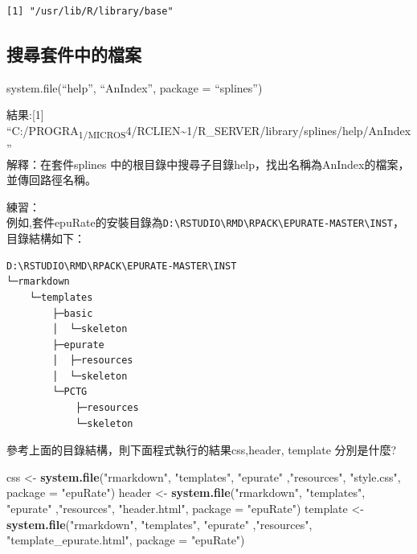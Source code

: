 \documentclass[]{book}
\newenvironment{Shaded}{\begin{snugshade}}{\end{snugshade}}
\newcommand{\DataTypeTok}[1]{\textcolor[rgb]{0.13,0.29,0.53}{#1}}
\newcommand{\KeywordTok}[1]{\textcolor[rgb]{0.13,0.29,0.53}{\textbf{#1}}}
\newcommand{\NormalTok}[1]{#1}
\newcommand{\StringTok}[1]{\textcolor[rgb]{0.31,0.60,0.02}{#1}}
\theoremstyle{definition}
\theoremstyle{definition}
\theoremstyle{definition}
\theoremstyle{remark}
\begin{document}
\begin{verbatim}
[1] "/usr/lib/R/library/base"
\end{verbatim}

\subsection{搜尋套件中的檔案}

system.file(``help'', ``AnIndex'', package = ``splines'')

結果:{[}1{]}
``C:/PROGRA\textsubscript{1/MICROS}4/RCLIEN\textasciitilde{}1/R\_SERVER/library/splines/help/AnIndex''\\
解釋：在套件splines
中的根目錄中搜尋子目錄help，找出名稱為AnIndex的檔案，並傳回路徑名稱。

練習：\\
例如,套件epuRate的安裝目錄為\texttt{D:\textbackslash{}RSTUDIO\textbackslash{}RMD\textbackslash{}RPACK\textbackslash{}EPURATE-MASTER\textbackslash{}INST}，目錄結構如下：

\begin{verbatim}
D:\RSTUDIO\RMD\RPACK\EPURATE-MASTER\INST
└─rmarkdown
    └─templates
        ├─basic
        │  └─skeleton
        ├─epurate
        │  ├─resources
        │  └─skeleton
        └─PCTG
            ├─resources
            └─skeleton
\end{verbatim}

參考上面的目錄結構，則下面程式執行的結果css,header, template 分別是什麼?

\begin{Shaded}
\begin{Highlighting}[]
\NormalTok{  css <-}\StringTok{ }\KeywordTok{system.file}\NormalTok{(}\StringTok{"rmarkdown"}\NormalTok{, }\StringTok{"templates"}\NormalTok{, }\StringTok{"epurate"}\NormalTok{ ,}\StringTok{"resources"}\NormalTok{, }\StringTok{"style.css"}\NormalTok{, }\DataTypeTok{package =} \StringTok{"epuRate"}\NormalTok{)}
\NormalTok{  header <-}\StringTok{ }\KeywordTok{system.file}\NormalTok{(}\StringTok{"rmarkdown"}\NormalTok{, }\StringTok{"templates"}\NormalTok{, }\StringTok{"epurate"}\NormalTok{ ,}\StringTok{"resources"}\NormalTok{, }\StringTok{"header.html"}\NormalTok{, }\DataTypeTok{package =} \StringTok{"epuRate"}\NormalTok{)}
\NormalTok{  template <-}\StringTok{ }\KeywordTok{system.file}\NormalTok{(}\StringTok{"rmarkdown"}\NormalTok{, }\StringTok{"templates"}\NormalTok{, }\StringTok{"epurate"}\NormalTok{ ,}\StringTok{"resources"}\NormalTok{, }\StringTok{"template_epurate.html"}\NormalTok{, }\DataTypeTok{package =} \StringTok{"epuRate"}\NormalTok{)}
  
\end{Highlighting}
\end{Shaded}
\end{document}
